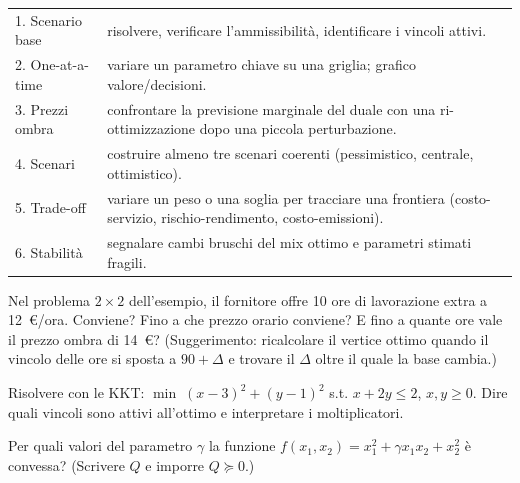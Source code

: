 \begin{center}\small
\begin{tabular}{lp{9.2cm}}
\toprule
1. Scenario base & risolvere, verificare l'ammissibilità, identificare i vincoli attivi. \\
2. One-at-a-time & variare un parametro chiave su una griglia; grafico valore/decisioni. \\
3. Prezzi ombra & confrontare la previsione marginale del duale con una ri-ottimizzazione
                  dopo una piccola perturbazione. \\
4. Scenari & costruire almeno tre scenari coerenti (pessimistico, centrale, ottimistico). \\
5. Trade-off & variare un peso o una soglia per tracciare una frontiera
               (costo-servizio, rischio-rendimento, costo-emissioni). \\
6. Stabilità & segnalare cambi bruschi del mix ottimo e parametri stimati fragili. \\
\bottomrule
\end{tabular}
\end{center}

\begin{esercizio}[dualità]
Nel problema $2\times2$ dell'esempio, il fornitore offre 10 ore di lavorazione extra a
12~\euro/ora. Conviene? Fino a che prezzo orario conviene? E fino a quante ore vale il
prezzo ombra di 14~\euro? (Suggerimento: ricalcolare il vertice ottimo quando il
vincolo delle ore si sposta a $90+\Delta$ e trovare il $\Delta$ oltre il quale
la base cambia.)
\end{esercizio}

\begin{esercizio}[KKT]
Risolvere con le KKT: $\min\; (x-3)^2 + (y-1)^2$ s.t. $x + 2y \le 2$, $x, y \ge 0$.
Dire quali vincoli sono attivi all'ottimo e interpretare i moltiplicatori.
\end{esercizio}

\begin{esercizio}[convessità]
Per quali valori del parametro $\gamma$ la funzione
$f(x_1, x_2) = x_1^2 + \gamma x_1 x_2 + x_2^2$ è convessa? (Scrivere $Q$ e imporre
$Q \succeq 0$.)
\end{esercizio}

